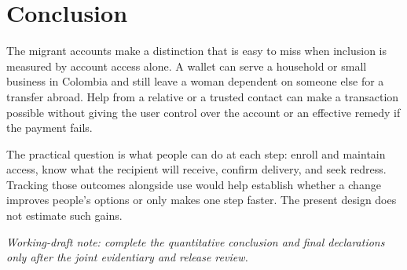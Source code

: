 \section{Conclusion}
The migrant accounts make a distinction that is easy to miss when inclusion is measured by account access alone. A wallet can serve a household or small business in Colombia and still leave a woman dependent on someone else for a transfer abroad. Help from a relative or a trusted contact can make a transaction possible without giving the user control over the account or an effective remedy if the payment fails.

The practical question is what people can do at each step: enroll and maintain access, know what the recipient will receive, confirm delivery, and seek redress. Tracking those outcomes alongside use would help establish whether a change improves people's options or only makes one step faster. The present design does not estimate such gains.

\emph{Working-draft note: complete the quantitative conclusion and final declarations only after the joint evidentiary and release review.}
